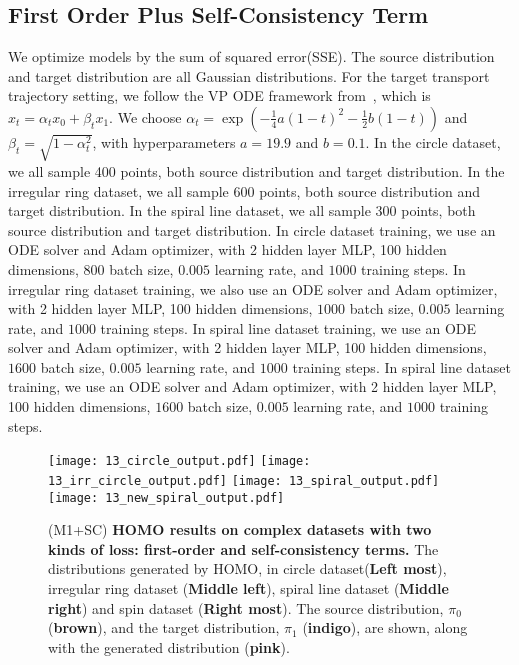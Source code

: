 \subsection{First Order Plus Self-Consistency Term}\label{sec:app:first_third}
We optimize models by the sum of squared error(SSE). The source distribution and target distribution are all Gaussian distributions. For the target transport trajectory setting, we follow the VP ODE framework from~\cite{rectified_flow}, which is $x_t = \alpha_t x_0 + \beta_t x_1$. We choose $\alpha_t = \exp(-\frac{1}{4} a(1-t)^2 - \frac{1}{2} b(1-t))$ and $\beta_t = \sqrt{1 - \alpha_t^2}$, with hyperparameters $a = 19.9$ and $b = 0.1$. In the circle dataset, we all sample 400 points, both source distribution and target distribution. In the irregular ring dataset, we all sample 600 points, both source distribution and target distribution. In the spiral line dataset, we all sample 300 points, both source distribution and target distribution. In circle dataset training, we use an ODE solver and Adam optimizer, with 2 hidden layer MLP, 100 hidden dimensions, $800$ batch size, $0.005$ learning rate, and $1000$ training steps. In irregular ring dataset training, we also use an ODE solver and Adam optimizer, with 2 hidden layer MLP, 100 hidden dimensions, $1000$ batch size, $0.005$ learning rate, and $1000$ training steps. In spiral line dataset training, we use an ODE solver and Adam optimizer, with 2 hidden layer MLP, 100 hidden dimensions, $1600$ batch size, $0.005$ learning rate, and $1000$ training steps. In spiral line dataset training, we use an ODE solver and Adam optimizer, with 2 hidden layer MLP, 100 hidden dimensions, $1600$ batch size, $0.005$ learning rate, and $1000$ training steps. 
\begin{figure}[!ht]
\centering
\texttt{[image: 13\_circle\_output.pdf]}
\texttt{[image: 13\_irr\_circle\_output.pdf]}
\texttt{[image: 13\_spiral\_output.pdf]}
\texttt{[image: 13\_new\_spiral\_output.pdf]}
\caption{
(M1+SC) \textbf{HOMO results on complex datasets with two kinds of loss: first-order and self-consistency terms.} The distributions generated by HOMO,
in circle dataset(\textbf{Left most}), irregular ring dataset (\textbf{Middle left}), spiral line dataset (\textbf{Middle right}) and spin dataset (\textbf{Right most}). 
The source distribution, $\pi_0$ ({\textbf{brown}}), and the target distribution, $\pi_1$ ({\textbf{indigo}}), are shown, along with the generated distribution ({\textbf{pink}}). }
\label{fig:m1_sc_appendix}
\end{figure}

